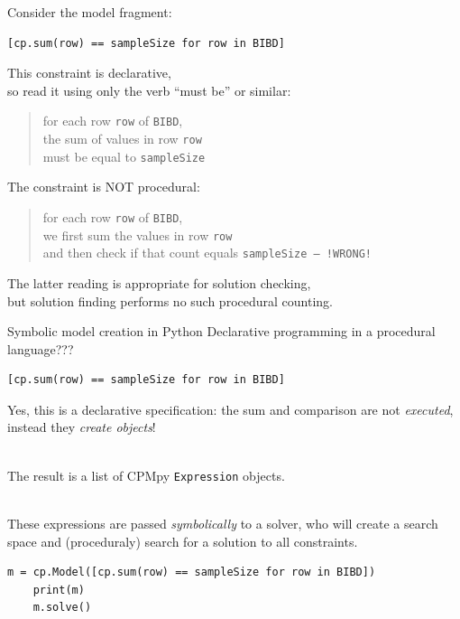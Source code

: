 \documentclass{cons-beamer}
\begin{document}
\begin{flashcardcpmpy}
\begin{frame}[fragile]
  Consider the model fragment:
  {\footnotesize
    \begin{lstlisting}[language=cpmpy,firstnumber=4]
    [cp.sum(row) == sampleSize for row in BIBD]\end{lstlisting}
  }

  This constraint is \alert{declarative}, \\
  so read it using only the verb ``must be'' or similar: \vfill
  \begin{quote}
    for each row \texttt{{row}} of \texttt{{BIBD}}, \\
    the sum of values in row \texttt{{row}} \\
    must be equal to \texttt{{sampleSize}}
  \end{quote}\vfill

  The constraint is \alert{NOT procedural}: \vfill
  \begin{quote}
    for each row \texttt{{row}} of \texttt{{BIBD}}, \\
    we first sum the values in row \texttt{{row}}\\
    and then check if that count equals \texttt{{sampleSize}}\texttt{~-- !WRONG!}
  \end{quote}\vfill
  The latter reading is appropriate for solution \alert{checking}, \\
  but solution \alert{finding} performs no such procedural counting.
\end{frame}

\begin{frame}[fragile]{Symbolic model creation in Python}
  Declarative programming in a procedural language???

  {\footnotesize
    \begin{lstlisting}[language=cpmpy,firstnumber=4]
    [cp.sum(row) == sampleSize for row in BIBD]\end{lstlisting}
  }

  \alert{Yes}, this is a declarative specification: the sum and comparison
  are not \textit{executed}, instead they \textit{create objects}!

  $ $\\ %
  The result is a list of CPMpy \texttt{Expression} objects.

  $ $\\ %
  These expressions are passed \textit{symbolically} to a solver, who will create a search space and (proceduraly) search for a solution to all constraints.
  
  {\footnotesize
    \begin{lstlisting}[language=cpmpy,firstnumber=14]
    m = cp.Model([cp.sum(row) == sampleSize for row in BIBD])
    print(m)
    m.solve()\end{lstlisting}
  }
\end{frame}
\end{flashcardcpmpy}
\end{document}
